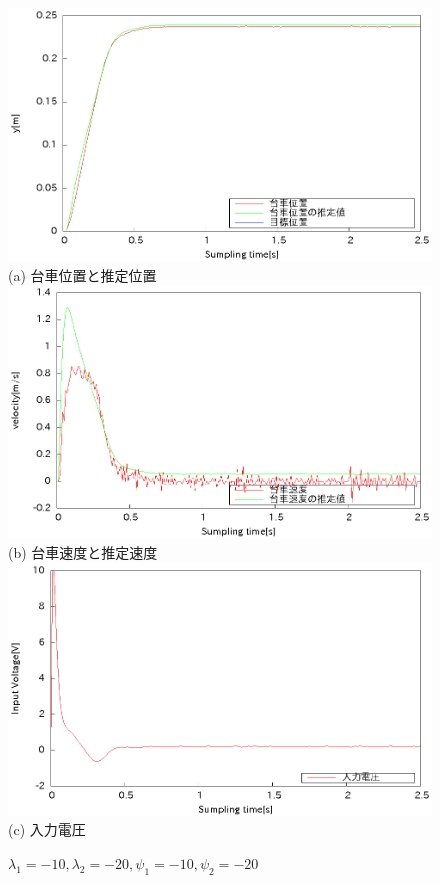 \documentclass[11pt,a4paper]{jsarticle}
\begin{document}
 \newpage
 \begin{figure}[H]
  \begin{center}
   \includegraphics[scale = .8]{./picture/exp5.eps} \\
   (a) 台車位置と推定位置 \\
   \includegraphics[scale = .8]{./picture/exp5_2.eps} \\
   (b) 台車速度と推定速度 \\
   \includegraphics[scale = .8]{./picture/exp5_3.eps} \\
   (c) 入力電圧
  \end{center}
  \caption{$\lambda_1 = -10,\lambda_2 = -20, \psi_1 = -10,\psi_2 = -20$}
 \end{figure}
\end{document}
